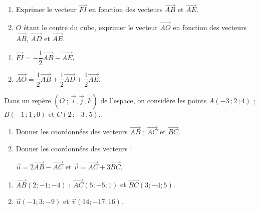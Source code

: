 \documentclass{cornouaille}
\begin{document}
\begin{colonne*exercice}
\begin{exercice*}
  \begin{enumerate}
  \item Exprimer le vecteur $\overrightarrow{FI}$ en fonction des
    vecteurs $\overrightarrow{AB}$ et $\overrightarrow{AE}$.
  \item $O$ étant le centre du cube, exprimer le vecteur
    $\overrightarrow{AO}$ en fonction des vecteurs
    $\overrightarrow{AB}$, $\overrightarrow{AD}$ et
    $\overrightarrow{AE}$.
  \end{enumerate}
\end{exercice*}
\begin{corrige}
  \begin{enumerate}
\item  $\overrightarrow{FI}=-\dfrac{1}{2}\overrightarrow{AB}-\overrightarrow{AE}$.
\item $\overrightarrow{AO}=\dfrac{1}{2}\overrightarrow{AB}+\dfrac{1}{2}\overrightarrow{AD}+\dfrac{1}{2}\overrightarrow{AE}$.
\end{enumerate}
\end{corrige}

\begin{exercice*}
  Dans un repère $(O\ ;\ \vec{i},\vec{j},\vec{k})$ de l'espace, on
  considère les points $A(-3\,;2\,;4)$ ; $B(-1\,;1\,;0)$ et $C(2\,;-3\,;5)$.
  \begin{enumerate}
  \item Donner les coordonnées des vecteurs $\overrightarrow{AB}$ ;
    $\overrightarrow{AC}$ et $\overrightarrow{BC}$.

  \item Donner les coordonnées des vecteurs :

    $\overrightarrow{u}=2\overrightarrow{AB}-\overrightarrow{AC}$ et
    $\overrightarrow{v}=\overrightarrow{AC}+3\overrightarrow{BC}$.
  \end{enumerate}
\end{exercice*}
\begin{corrige}
  \begin{enumerate}
\item  $\overrightarrow{AB}(2;-1;-4)$ ; $\overrightarrow{AC}(5;-5;1)$ et $\overrightarrow{BC}(3;-4;5)$.
\item 
$\overrightarrow{u}(-1;3;-9)$ et $\overrightarrow{v}(14;-17;16)$.
\end{enumerate}
\end{corrige}


\end{colonne*exercice}
\end{document}
